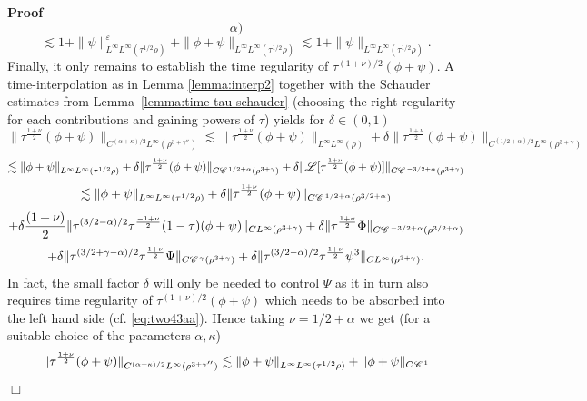\documentclass[a4paper,11pt]{article}
\newenvironment{proof}{\noindent\textbf{Proof\ }}{\hspace*{\fill}$\Box$\medskip}
\numberwithin{equation}{section}
\newcommand{\CC}{\mathscr{C} \hspace{.1em}}
\newcommand{\LL}{\mathscr{L}}
\newcommand{\rmbb}[1]{\textcolor{black}{#1}}
\newcommand{\8}{\infty}
\begin{document}
\begin{proof}
\[{{     \alpha})} \]
  \[ \lesssim 1 + \| \psi \|_{L^{\infty} L^{\infty} (\tau^{1 / 2}
     \rho)}^{\varepsilon} + \| \phi + \psi \|_{L^{\infty} L^{\infty} (\tau^{1
     / 2} \rho)} \lesssim 1 + \| \psi \|_{L^{\infty} L^{\infty}
     (\tau^{1 / 2} \rho)}^{} . \]
  Finally, it only remains to establish the time regularity of $\tau^{(1 +
  \nu) / 2} (\phi + \psi)$. A time-interpolation as in Lemma \ref{lemma:interp2} together with the Schauder estimates from
  Lemma~\ref{lemma:time-tau-schauder} (choosing the right regularity for each contributions and gaining
  powers of $\tau$)  yields for  $\delta\in(0,1)$
  \[ \| \tau^{\frac{1 + \nu}{2}} (\phi + \psi) \|_{C^{(\alpha + \kappa) / 2}
     L^{\infty} (\rho^{3 + \gamma''})}\lesssim  \| \tau^{\frac{1 + \nu}{2}} (\phi + \psi) \|_{L^{\8}     L^{\infty} (\rho)}+\delta \| \tau^{\frac{1 + \nu}{2}} (\phi + \psi) \|_{C^{(1/2+\alpha) / 2}
     L^{\infty} (\rho^{3 + \gamma})} \]
  \[ \lesssim  \| \phi + \psi \|_{L^{\infty} L^{\infty} (\tau^{1
     / 2} \rho)} +\delta \| \tau^{\frac{1 + \nu}{2}} (\phi + \psi) \|_{C \CC^{1/2+\alpha} (\rho^{3 + \gamma})} + \delta\| \LL [\tau^{\frac{1 + \nu}{2}} (\phi +
     \psi)]\|_{C \CC^{- 3/2 + \alpha} (\rho^{3 + \gamma})} \]
  \[ \lesssim \| \phi + \psi \|_{L^{\infty} L^{\infty} (\tau^{1
     / 2} \rho)} +\delta \| \tau^{\frac{1 + \nu}{2}} (\phi + \psi) \|_{C \CC^{1/2+\alpha} (\rho^{3/2 + \alpha})} \]
  \[ +\delta \frac{(1 + \nu)}{2} \| \tau^{(3/2 - \alpha
     ) / 2} \tau^{\frac{- 1 + \nu}{2}} (1 - \tau) (\phi + \psi) \|_{C
     L^{\infty} (\rho^{3 + \gamma})}+ \delta\|\tau^{\frac{1 + \nu}{2}} \Phi \|_{C \CC^{-
     3 / 2 + \alpha} (\rho^{3/2 + \alpha})} \]
  \begin{equation}\label{eq:tregpsi}
     + \delta\| \tau^{(3/2 + \gamma 
     - \alpha) / 2} \tau^{\frac{1 + \nu}{2}} \Psi \|_{C \CC^{\gamma}
     (\rho^{3 + \gamma})}+ \rmbb{\delta\| \tau^{(3/2  
     - \alpha) / 2} \tau^{\frac{1 + \nu}{2}} \psi^{3} \|_{C L^{\infty}
     (\rho^{3 + \gamma})} }. 
\end{equation}
 In fact, the small factor $\delta$ will only be needed to control $\Psi$ as it in turn also requires time regularity of $\tau^{(1+\nu)/2}(\phi+\psi)$ which needs to be absorbed into the left hand side (cf. \eqref{eq:two43aa}). Hence taking $\nu = 1 / 2 + \alpha$ we get (for a suitable choice of the
  parameters $\alpha, \kappa$)
\[
 \| \tau^{\frac{1 + \nu}{2}} (\phi + \psi) \|_{C^{(\alpha + \kappa) / 2}
     L^{\infty} (\rho^{3 + \gamma''})} \lesssim \|
     \phi + \psi \|_{L^{\infty} L^{\infty} (\tau^{1 / 2} \rho)}+ \| \phi + \psi \|_{C^{} \CC^{1
}}\]
\end{proof}
\end{document}

